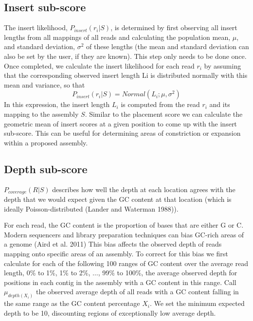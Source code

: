 \documentclass[phd,tocprelim]{cornell}
\begin{document}
\subsection{Insert sub-score} %
\label{sub:Insert sub-score}

The insert likelihood, $P_{insert}\left(r_{i}|S\right)$, is determined by first observing all insert lengths from all mappings of all reads and calculating the population mean, $\mu$, and standard deviation, $\sigma^{2}$ of these lengths (the mean and standard deviation can also be set by the user, if they are known). This step only needs to be done once.  Once completed, we calculate the insert likelihood for each read $r_{i}$ by assuming that the corresponding observed insert length Li is distributed normally with this mean and variance, so that
\begin{equation}
    P_{insert}\left(r_{i}|S\right) = Normal\left(L_{i};\mu,\sigma^{2}\right)
\end{equation}
In this expression, the insert length $L_{i}$ is computed from the read $r_{i}$ and its mapping to the assembly $S$. Similar to the placement score we can calculate the geometric mean of insert scores at a given position to come up with the insert sub-score. This can be useful for determining areas of constriction or expansion within a proposed assembly.


\subsection{Depth sub-score} %
\label{sub:Depth sub-score}

$P_{coverage}(R|S)$ describes how well the depth at each location agrees with the depth that we would expect given the GC content at that location (which is ideally Poisson-distributed (Lander and Waterman 1988)).

For each read, the GC content is the proportion of bases that are either G or C. Modern sequencers and library preparation techniques can bias GC-rich areas of a genome (Aird et al. 2011) This bias affects the observed depth of reads mapping onto specific areas of an assembly. To correct for this bias we first calculate for each of the following 100 ranges of GC content over the average read length, 0\% to 1\%, 1\% to 2\%, $\ldots$, 99\% to 100\%, the average observed depth for positions in each contig in the assembly with a GC content in this range. Call $\mu_{depth(X_{i})}$ the observed average depth of all reads with a GC content falling in the same range as the GC content percentage $X_{i}$. We set the minimum expected depth to be 10, discounting regions of exceptionally low average depth.
\end{document}
